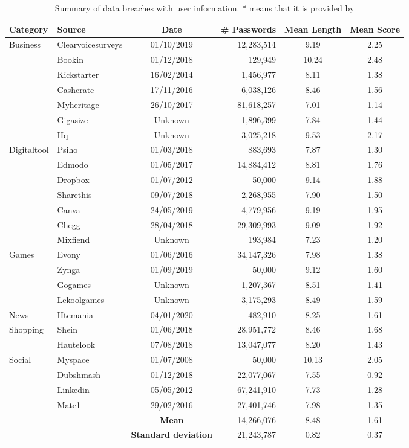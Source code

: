 \begin{table*}[h!]
\centering
\begin{tabular}{|l|l|c|r|c|c|}
\hline
\textbf{Category} & \textbf{Source} & \textbf{Date} & \textbf{\# Passwords} & \textbf{Mean Length} & \textbf{Mean Score} \\
\hline
Business&Clearvoicesurveys & 01/10/2019  & 12,283,514 & 9.19 & 2.25 \\
&Bookin & 01/12/2018  & 129,949 & 10.24 & 2.48 \\
&Kickstarter & 16/02/2014  & 1,456,977 & 8.11 & 1.38 \\
&Cashcrate & 17/11/2016  & 6,038,126 & 8.46 & 1.56 \\
&Myheritage & 26/10/2017  & 81,618,257 & 7.01 & 1.14 \\
&Gigasize & Unknown  & 1,896,399 & 7.84 & 1.44 \\
&Hq & Unknown  & 3,025,218 & 9.53 & 2.17 \\
\hline
Digitaltool&Psiho & 01/03/2018  & 883,693 & 7.87 & 1.30 \\
&Edmodo & 01/05/2017  & 14,884,412 & 8.81 & 1.76 \\
&Dropbox & 01/07/2012  & 50,000 & 9.14 & 1.88 \\
&Sharethis & 09/07/2018  & 2,268,955 & 7.90 & 1.50 \\
&Canva & 24/05/2019  & 4,779,956 & 9.19 & 1.95 \\
&Chegg & 28/04/2018  & 29,309,993 & 9.09 & 1.92 \\
&Mixfiend & Unknown  & 193,984 & 7.23 & 1.20 \\
\hline
Games&Evony & 01/06/2016  & 34,147,326 & 7.98 & 1.38 \\
&Zynga & 01/09/2019  & 50,000 & 9.12 & 1.60 \\
&Gogames & Unknown  & 1,207,367 & 8.51 & 1.41 \\
&Lekoolgames & Unknown  & 3,175,293 & 8.49 & 1.59 \\
\hline
News&Htcmania & 04/01/2020  & 482,910 & 8.25 & 1.61 \\
\hline
Shopping&Shein & 01/06/2018  & 28,951,772 & 8.46 & 1.68 \\
&Hautelook & 07/08/2018  & 13,047,077 & 8.20 & 1.43 \\
\hline
Social&Myspace & 01/07/2008  & 50,000 & 10.13 & 2.05 \\
&Dubshmash & 01/12/2018  & 22,077,067 & 7.55 & 0.92 \\
&Linkedin & 05/05/2012  & 67,241,910 & 7.73 & 1.28 \\
&Mate1 & 29/02/2016  & 27,401,746 & 7.98 & 1.35 \\
\hline
\cline{3-6}
\multicolumn{2}{l|}{\multirow{2}{*}{}}& \textbf{Mean}& 14,266,076 & 8.48 & 1.61 \\
\cline{3-6}
\multicolumn{2}{l|}{}& \textbf{Standard deviation}& 21,243,787 & 0.82 & 0.37 \\
\cline{3-6}\end{tabular}
\label{table:dataleaks}\caption{Summary of data breaches with user information. \tiny{* means that it is provided by \cite{dionysiou2021honeygen}}}
\end{table*}
